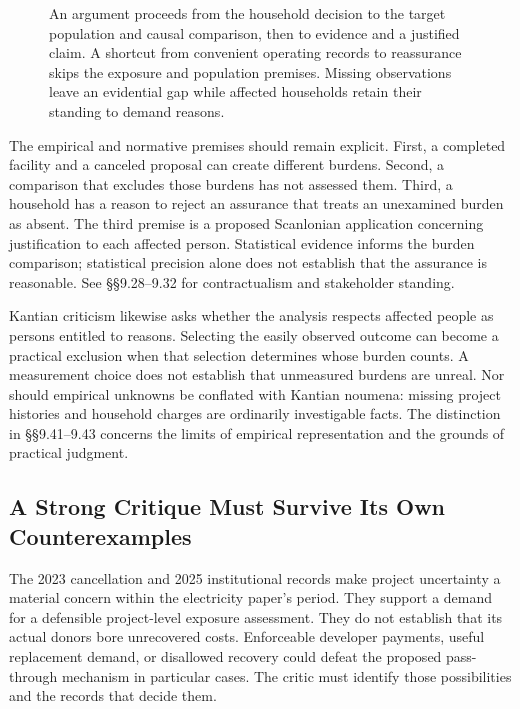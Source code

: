 \begin{figure}[htbp]
\centering

\caption{An argument proceeds from the household decision to the target population and causal comparison, then to evidence and a justified claim. A shortcut from convenient operating records to reassurance skips the exposure and population premises. Missing observations leave an evidential gap while affected households retain their standing to demand reasons.}\label{fig:M09_design_and_reasons}
\end{figure}

The empirical and normative premises should remain explicit. First, a
completed facility and a canceled proposal can create different burdens.
Second, a comparison that excludes those burdens has not assessed them.
Third, a household has a reason to reject an assurance that treats an
unexamined burden as absent. The third premise is a proposed Scanlonian
application concerning justification to each affected person.
Statistical evidence informs the burden comparison; statistical
precision alone does not establish that the assurance is reasonable. See
§§9.28--9.32 for contractualism and stakeholder standing.

Kantian criticism likewise asks whether the analysis respects affected
people as persons entitled to reasons. Selecting the easily observed
outcome can become a practical exclusion when that selection determines
whose burden counts. A measurement choice does not establish that
unmeasured burdens are unreal. Nor should empirical unknowns be
conflated with Kantian noumena: missing project histories and household
charges are ordinarily investigable facts. The distinction in
§§9.41--9.43 concerns the limits of empirical representation and the
grounds of practical judgment.

\hypertarget{M09-a-strong-critique-must-survive-its-own-counterexamples}{%
\subsection{A Strong Critique Must Survive Its Own
Counterexamples}\label{M09-a-strong-critique-must-survive-its-own-counterexamples}}

\noindent \noindent The 2023 cancellation and 2025 institutional records make
project uncertainty a material concern within the electricity paper's
period. They support a demand for a defensible project-level exposure
assessment. They do not establish that its actual donors bore
unrecovered costs. Enforceable developer payments, useful replacement
demand, or disallowed recovery could defeat the proposed pass-through
mechanism in particular cases. The critic must identify those
possibilities and the records that decide them.

